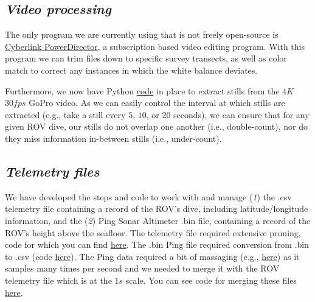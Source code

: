 \documentclass[11pt]{article}
\begin{document}
\subsection{\textit{Video processing}}
The only program we are currently using that is not freely open-source 
is 
\href{https://www.cyberlink.com/products/powerdirector-video-editing-software/features_en_US.html?r=1}{Cyberlink
 PowerDirector}, a subscription based video editing program.
With this program we can trim files down to specific survey transects, 
as well as color match to correct any instances in which the white 
balance deviates.

Furthermore, we now have Python
\href{https://github.com/zhrandell/Seattle_Aquarium_ROV_telemetry_imagery_analysis/blob/main/code/4k_to_still.py}{code} in place to extract stills from the $4K$ $30fps$ GoPro video. 
As we can easily control the interval at which stills are extracted 
(e.g., take a still every $5$, $10$, or $20$ seconds), we can ensure 
that for any given ROV dive, our stills do not overlap one another 
(i.e., double-count), nor do they miss information in-between stills 
(i.e., under-count).   

\subsection{\textit{Telemetry files}}
We have developed the steps and code to work with and manage 
(\textit{1}) the .csv telemetry file containing a record of the ROV's 
dive, including latitude/longitude information, and the (\textit{2}) 
Ping Sonar Altimeter .bin file, containing a record of the ROV's height 
above the seafloor. 
The telemetry file required extensive pruning, code for which you can 
find 
\href{https://github.com/zhrandell/Seattle_Aquarium_ROV_telemetry_imagery_analysis/blob/main/code/tracklog_cleaning.R}{here}.
The .bin Ping file required conversion from .bin to .csv (code 
\href{https://github.com/zhrandell/Seattle_Aquarium_ROV_telemetry_imagery_analysis/blob/main/code/Ping_to_csv.py}{here}).
The Ping data required a bit of massaging (e.g., 
\href{https://github.com/zhrandell/Seattle_Aquarium_ROV_telemetry_imagery_analysis/issues/3#issuecomment-1225997792}{here})
 as it samples many times per second and we needed to merge it with the 
 ROV telemetry file which is at the $1s$ scale.
You can see code for merging these files  
\href{https://github.com/zhrandell/Seattle_Aquarium_ROV_telemetry_imagery_analysis/blob/main/code/ROV_telemetry_file_work.R}{here}.
\end{document}
